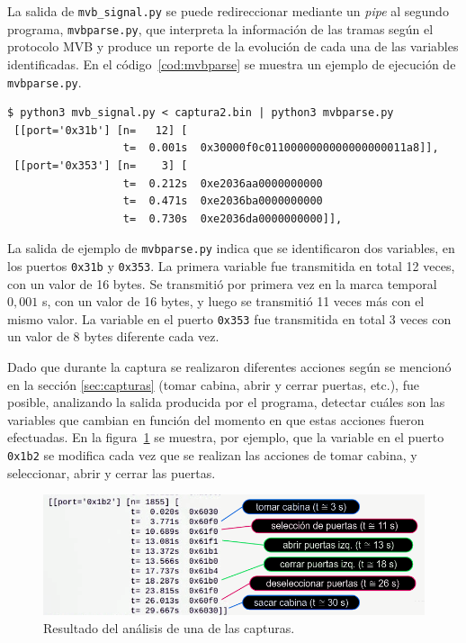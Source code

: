 La salida de \texttt{mvb\_signal.py} se puede redireccionar mediante un \textit{pipe} al segundo programa, \texttt{mvbparse.py}, que interpreta la información de las tramas según el protocolo MVB y produce un reporte de la evolución de cada una de las variables identificadas. En el código~\ref{cod:mvbparse} se muestra un ejemplo de ejecución de \texttt{mvbparse.py}.

\begin{lstlisting}[label=cod:mvbparse,caption=Ejemplo de ejecución de \texttt{mvbparse.py}.,float=htbp,basicstyle=\footnotesize,breaklines=true]
$ python3 mvb_signal.py < captura2.bin | python3 mvbparse.py
 [[port='0x31b'] [n=   12] [
                  t=  0.001s  0x30000f0c0110000000000000000011a8]],
 [[port='0x353'] [n=    3] [
                  t=  0.212s  0xe2036aa0000000000
                  t=  0.471s  0xe2036ba0000000000
                  t=  0.730s  0xe2036da0000000000]],
\end{lstlisting}

La salida de ejemplo de \texttt{mvbparse.py} indica que se identificaron dos variables, en los puertos \texttt{0x31b} y \texttt{0x353}.
La primera variable fue transmitida en total 12 veces, con un valor de 16 bytes. Se transmitió por primera vez en la marca temporal $0{,}001$ s, con un valor de 16 bytes, y luego se transmitió 11 veces más con el mismo valor.
La variable en el puerto \texttt{0x353} fue transmitida en total 3 veces con un valor de 8 bytes diferente cada vez.

Dado que durante la captura se realizaron diferentes acciones según se mencionó en la sección \ref{sec:capturas} (tomar cabina, abrir y cerrar puertas, etc.), fue posible, analizando la salida producida por el programa, detectar cuáles son las variables que cambian en función del momento en que estas acciones fueron efectuadas. En la figura~\ref{fig:analisis-captura} se muestra, por ejemplo, que la variable en el puerto \texttt{0x1b2} se modifica cada vez que se realizan las acciones de tomar cabina, y seleccionar, abrir y cerrar las puertas.

\begin{figure}[htbp]
	\centering
	\includegraphics[width=\textwidth]{./Figures/analisis-captura.png}
	\caption[Resultado del análisis de una de las capturas.]{Resultado del análisis de una de las capturas.}
    \label{fig:analisis-captura}
\end{figure}

